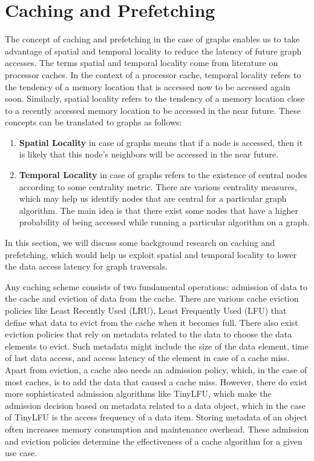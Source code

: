 \section{Caching and Prefetching}\label{sec:cachingDistSys}
The concept of caching and prefetching in the case of graphs enables us to take
advantage of spatial and temporal locality to reduce the latency of future graph
accesses. The terms spatial and temporal locality come from literature on
processor caches. In the context of a processor cache, temporal locality refers
to the tendency of a memory location that is accessed now to be
accessed again soon. Similarly, spatial locality refers to the 
tendency of a memory location close to a recently accessed memory location to be
accessed in the near future. These concepts can be translated to graphs as
follows:
\begin{enumerate}
    \item \textbf{Spatial Locality} in case of graphs means that if a node is
        accessed, then it is likely that this node's neighbors will be accessed
        in the near future.
    \item \textbf{Temporal Locality} in case of graphs refers to the existence
        of central nodes according to some centrality metric. There are
        various centrality measures\cite{klein2010centrality}, which may help us 
        identify nodes that are central for a particular graph algorithm. The
        main idea is that there exist some nodes that have a higher probability
        of being accessed while running a particular algorithm on a graph.
\end{enumerate}
In this section, we will discuss some background research on caching and
prefetching, which would help us exploit  spatial and temporal locality to lower
the data access latency for graph traversals.

\medskip
Any caching scheme consists of two fundamental operations: admission of
data to the cache and eviction of data from the cache. There are various cache
eviction policies like Least Recently Used (LRU), Least Frequently Used (LFU)
that define what data to evict from the cache when it becomes
full. There also exist eviction policies that rely on metadata related to the
data to choose the data elements to evict. Such metadata might
include the size of the data element, time of last data access, and access latency
of the element in case of a cache miss. Apart from eviction, a cache also needs
an admission policy, which, in the case of most caches, is to add the data that
caused a cache miss. However, there do exist more sophisticated
admission algorithms like TinyLFU\cite{einziger2017tinylfu}, which make the
admission decision based on metadata related to a data object, which in the case of
TinyLFU is the access frequency of a data item. Storing metadata of an
object often increases memory consumption and maintenance overhead. These
admission and eviction policies determine the effectiveness of a cache algorithm
for a given use case.

